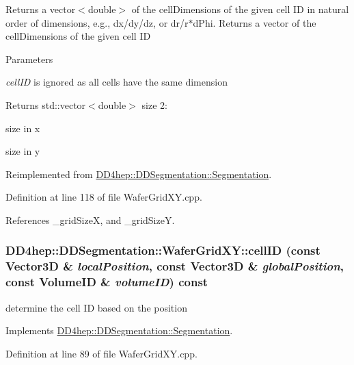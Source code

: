 Returns a vector$<$double$>$ of the cellDimensions of the given cell ID in natural order of dimensions, e.g., dx/dy/dz, or dr/r$\ast$dPhi. Returns a vector of the cellDimensions of the given cell ID 
\begin{DoxyParams}{Parameters}
\item[{\em cellID}]is ignored as all cells have the same dimension \end{DoxyParams}
\begin{DoxyReturn}{Returns}
std::vector$<$double$>$ size 2:
\begin{DoxyEnumerate}
\item size in x
\item size in y 
\end{DoxyEnumerate}
\end{DoxyReturn}


Reimplemented from \hyperlink{class_d_d4hep_1_1_d_d_segmentation_1_1_segmentation_a9710f4942d7f6b52ae5342652e17c88d}{DD4hep::DDSegmentation::Segmentation}.

Definition at line 118 of file WaferGridXY.cpp.

References \_\-gridSizeX, and \_\-gridSizeY.\hypertarget{class_d_d4hep_1_1_d_d_segmentation_1_1_wafer_grid_x_y_a9212a3077b9a25425612aa52d121bac9}{
\subsubsection[{cellID}]{ DD4hep::DDSegmentation::WaferGridXY::cellID (const {\bf Vector3D} \& {\em localPosition}, \/  const {\bf Vector3D} \& {\em globalPosition}, \/  const {\bf VolumeID} \& {\em volumeID}) const}}
\label{class_d_d4hep_1_1_d_d_segmentation_1_1_wafer_grid_x_y_a9212a3077b9a25425612aa52d121bac9}


determine the cell ID based on the position 

Implements \hyperlink{class_d_d4hep_1_1_d_d_segmentation_1_1_segmentation_ad5a60953d96d409850d8192f64f8ce3c}{DD4hep::DDSegmentation::Segmentation}.

Definition at line 89 of file WaferGridXY.cpp.


